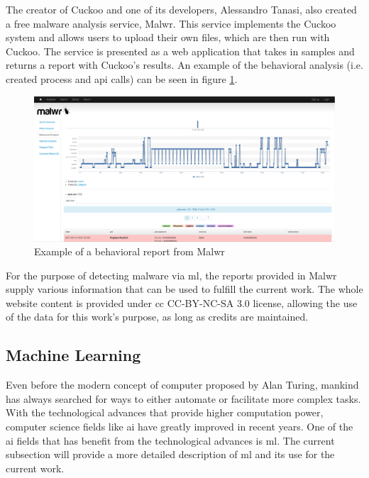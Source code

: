 \documentclass{llncs}
\begin{document}
The creator of Cuckoo and one of its developers, Alessandro Tanasi, also created a free malware analysis service, Malwr\cite{tool:malwr}. This service implements the Cuckoo system and allows users to upload their own files, which are then run with Cuckoo. The service is presented as a web application that takes in samples and returns a report with Cuckoo's results. An example of the behavioral analysis (i.e. created process and \gls{api} calls) can be seen in figure \ref{fig:malwr_sample}.

\begin{figure}[h]
	\includegraphics[width=\textwidth]{malwr_sample}
	\caption{Example of a behavioral report from Malwr}
	\label{fig:malwr_sample}
\end{figure}

For the purpose of detecting malware via \gls{ml}, the reports provided in Malwr supply various information that can be used to fulfill the current work. The whole website content is provided under \gls{cc} CC-BY-NC-SA 3.0\cite{cc-by-nc-sa} license, allowing the use of the data for this work's purpose, as long as credits are maintained.

\subsection{Machine Learning}\label{subsec:ml}

Even before the modern concept of computer proposed by Alan Turing, mankind has always searched for ways to either automate or facilitate more complex tasks. With the technological advances that provide higher computation power, computer science fields like \gls{ai} have greatly improved in recent years. One of the \gls{ai} fields that has benefit from the technological advances is \gls{ml}. The current subsection will provide a more detailed description of \gls{ml} and its use for the current work.
\end{document}

